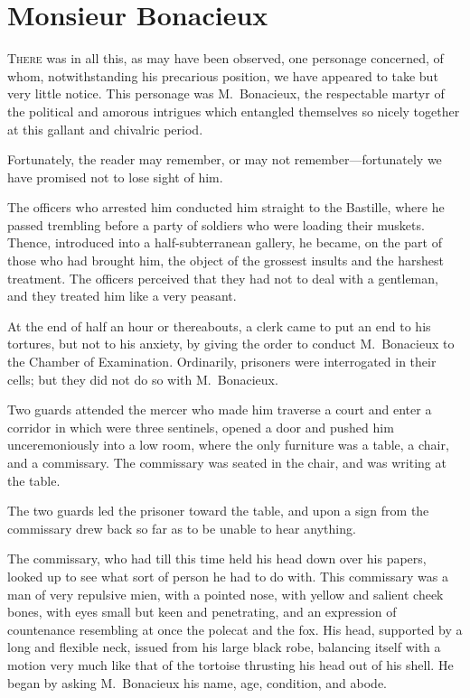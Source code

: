 
\chapter{Monsieur Bonacieux}

\lettrine{T}{here} was in all this, as may have been observed, one personage concerned, of whom, notwithstanding his precarious position, we have appeared to take but very little notice. This personage was M.~Bonacieux, the respectable martyr of the political and amorous intrigues which entangled themselves so nicely together at this gallant and chivalric period. 

Fortunately, the reader may remember, or may not remember—fortunately we have promised not to lose sight of him. 

The officers who arrested him conducted him straight to the Bastille, where he passed trembling before a party of soldiers who were loading their muskets. Thence, introduced into a half-subterranean gallery, he became, on the part of those who had brought him, the object of the grossest insults and the harshest treatment. The officers perceived that they had not to deal with a gentleman, and they treated him like a very peasant. 

At the end of half an hour or thereabouts, a clerk came to put an end to his tortures, but not to his anxiety, by giving the order to conduct M.~Bonacieux to the Chamber of Examination. Ordinarily, prisoners were interrogated in their cells; but they did not do so with M.~Bonacieux. 

Two guards attended the mercer who made him traverse a court and enter a corridor in which were three sentinels, opened a door and pushed him unceremoniously into a low room, where the only furniture was a table, a chair, and a commissary. The commissary was seated in the chair, and was writing at the table. 

The two guards led the prisoner toward the table, and upon a sign from the commissary drew back so far as to be unable to hear anything. 

The commissary, who had till this time held his head down over his papers, looked up to see what sort of person he had to do with. This commissary was a man of very repulsive mien, with a pointed nose, with yellow and salient cheek bones, with eyes small but keen and penetrating, and an expression of countenance resembling at once the polecat and the fox. His head, supported by a long and flexible neck, issued from his large black robe, balancing itself with a motion very much like that of the tortoise thrusting his head out of his shell. He began by asking M.~Bonacieux his name, age, condition, and abode. 

